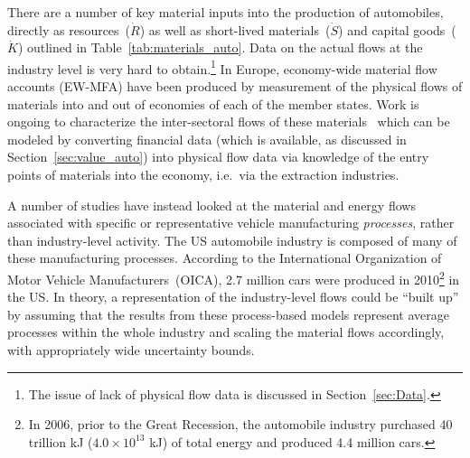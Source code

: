 There are a number of key material inputs into the
production of automobiles, directly as 
resources~($\dot{R}$) as well as short-lived 
materials~($\dot{S}$) and capital goods~($\dot{K}$)
outlined in Table~\ref{tab:materials_auto}. 
Data on the actual flows %
at the industry level
is very hard to obtain.\footnote{The issue of 
lack of physical flow data is discussed in 
Section~\ref{sec:Data}.
}
In Europe,
economy-wide material flow accounts (EW-MFA)
have been produced by measurement of the physical flows
of materials into and out of economies of 
each of the member states.\cite{EUROSTAT2011} 
Work is ongoing to characterize the inter-sectoral
flows of these materials~\cite{ConAccount1998}
which can be modeled by converting financial data 
(which is available, as discussed in 
Section~\ref{sec:value_auto}) into physical flow data
via knowledge of the entry points of materials into the economy,
i.e.\ via the extraction industries.

A number of studies have instead looked at 
the material and energy flows 
associated with specific or representative vehicle manufacturing 
\emph{processes}, rather than industry-level
activity.\cite{Sullivan1998, MacLean1998,Schweimer2000,
McCleese2002,MacLean2003, Burnham2006,Sullivan2010, Hawkins2012}
The US automobile industry is composed
of many of these manufacturing processes.
According to the International Organization of 
Motor Vehicle Manufacturers~(OICA), 
2.7 million cars were produced in 2010\footnote{In 2006, 
prior to the Great Recession, 
the automobile industry purchased 
40 trillion kJ ($4.0 \times 10^{13}$ kJ) of total energy and 
produced 4.4 million cars.
} 
in the US.\cite{Motor-Vehicle-Manufacturers-OICA:2014aa}
In theory,
a representation of the industry-level flows
could be ``built up'' by assuming that the results from
these process-based models represent average
processes within the whole industry and 
scaling the material flows accordingly,
with appropriately wide uncertainty bounds.



